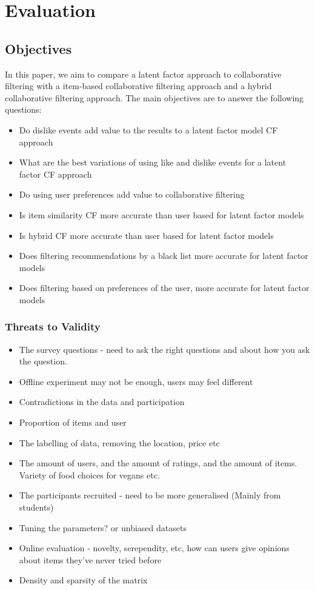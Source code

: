 \chapter{Evaluation}\label{C:evaluation}

\section{Objectives}

In this paper, we aim to compare a latent factor approach to collaborative filtering with a item-based collaborative filtering approach and a hybrid collaborative filtering approach. The main objectives are to answer the following questions:
\begin{itemize}
	\item{Do dislike events add value to the results to a latent factor model CF approach}
	\item{What are the best variations of using like and dislike events for a latent factor CF approach}
	\item{Do using user preferences add value to collaborative filtering}
	\item{Is item similarity CF more accurate than user based for latent factor models}
	\item{Is hybrid CF more accurate than user based for latent factor models}
	\item{Does filtering recommendations by a black list more accurate for latent factor models}
	\item{Does filtering based on preferences of the user, more accurate for latent factor models}
\end{itemize}

\subsection{Threats to Validity}
\begin{itemize}
	\item{The survey questions - need to ask the right questions and about how you ask the question.}
	\item{Offline experiment may not be enough, users may feel different}
	\item{Contradictions in the data and participation}
	\item{Proportion of items and user}
	\item{The labelling of data, removing the location, price etc}
	\item{The amount of users, and the amount of ratings, and the amount of items. Variety of food choices for vegans etc. }
	\item{The participants recruited - need to be more generalised (Mainly from students)}
	\item{Tuning the parameters? or unbiased datasets}
	\item{Online evaluation - novelty, serependity, etc, how can users give opinions about items they've never tried before}
	\item{Density and sparsity of the matrix}
\end{itemize}

